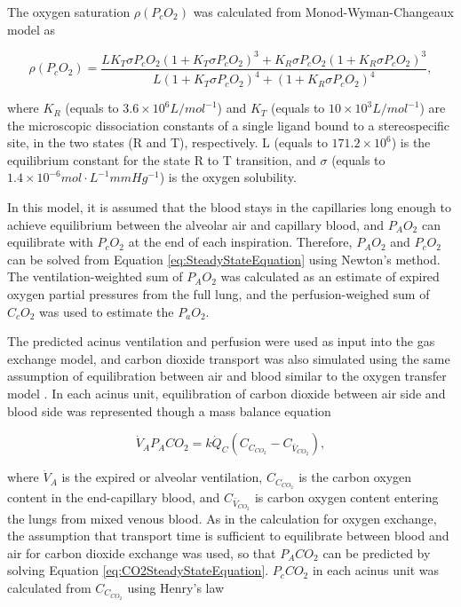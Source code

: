 The oxygen saturation $\rho(P_cO_2)$ was calculated from Monod-Wyman-Changeaux model \citep{monod1965nature} as

\begin{equation} 
 \label{eq:OxygenSaturation}
 \rho(P_cO_2) = \frac{LK_T \sigma P_cO_2 (1+K_T\sigma P_cO_2)^3 + K_R\sigma P_cO_2(1+K_R\sigma P_cO_2)^3}{L(1+K_T \sigma P_cO_2)^4 + (1+K_R \sigma P_cO_2)^4},
\end{equation}

\noindent where $K_R$ (equals to $3.6 \times 10^6 L/mol^{-1}$) and  $K_T$ (equals to $10 \times 10^3 L/mol^{-1}$) are the microscopic dissociation constants of a single ligand bound to a stereospecific site, in the two states (R and T), respectively. L (equals to $171.2 \times 10^6$) is the equilibrium constant for the state R to T transition, and $\sigma$ (equals to $1.4 \times 10^{-6} mol \cdot L^{-1}mm Hg^{-1}$) is the oxygen solubility.

In this model, it is assumed that the blood stays in the capillaries long enough to achieve equilibrium between the alveolar air and capillary blood, and $P_AO_2$ can equilibrate with $P_cO_2$ at the end of each inspiration. Therefore, $P_AO_2$ and $P_cO_2$ can be solved from Equation \ref{eq:SteadyStateEquation} using Newton’s method. The ventilation-weighted sum of $P_AO_2$ was calculated as an estimate of expired oxygen partial pressures from the full lung, and the perfusion-weighed sum of $C_cO_2$ was used to estimate the $P_aO_2$.

The predicted acinus ventilation and perfusion were used as input into the gas exchange model, and carbon dioxide transport was also simulated using the same assumption of equilibration between air and blood similar to the oxygen transfer model \citep{kapitan1986computer}. In each acinus unit, equilibration of carbon dioxide between air side and blood side was represented though a mass balance equation

\begin{equation} 
 \label{eq:CO2SteadyStateEquation}
 \dot{V}_A P_ACO_2 = k\dot{Q}_C(C_{C_{CO_2}} - C_{\bar{V}_{CO_2}}),
\end{equation}

\noindent where $\dot{V}_A$ is the expired or alveolar ventilation, $C_{C_{CO_2}}$ is the carbon oxygen content in the end-capillary blood, and $C_{\bar{V}_{CO_2}}$ is carbon oxygen content entering the lungs from mixed venous blood. As in the calculation for oxygen exchange, the assumption that transport time is sufficient to equilibrate between blood and air for carbon dioxide exchange was used, so that $P_ACO_2$ can be predicted by solving Equation \ref{eq:CO2SteadyStateEquation}. $P_cCO_2$ in each acinus unit was calculated from $C_{C_{CO_2}}$ using Henry’s law

